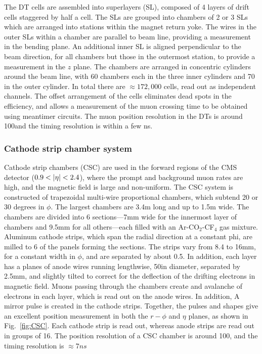 The DT cells are assembled into superlayers (SL), composed of 
4 layers of drift cells staggered by half a cell. 
The SLs are grouped into chambers of 2 or 3 SLs which are arranged into stations
within the magnet return yoke.
The wires in the outer SLs within a chamber are parallel to beam line, providing
a measurement in the bending plane.
An additional inner SL is aligned perpendicular to the beam direction, 
for all chambers but those in the 
outermost station, to provide a measurement in the $z$ plane. 
The chambers are arranged in concentric cylinders
around the beam line, with 60 chambers each in the three inner cylinders
and 70 in the outer cylinder. In total there are $\approx172,000$ 
cells, read out as independent channels. The offset arrangement of the cells
eliminates dead spots in the efficiency, and allows a measurement of the
muon crossing time to be obtained using meantimer circuits.
The muon position resolution in the DTs is around 100\micron and the
timing resolution is within a few ns.

\subsubsection{Cathode strip chamber system}

Cathode strip chambers (CSC) are used in
the forward regions of the CMS detector ($0.9 < \lvert \eta \rvert < 2.4$), 
where the prompt and background muon rates are high, and the magnetic field
is large and non-uniform. The CSC system is constructed of trapezoidal
multi-wire proportional chambers,
which subtend 20 or 30 degrees in $\phi$. The largest chambers are 3.4\unit{m}
long and up to 1.5\unit{m} wide. The chambers are divided into 6 sections---7\unit{mm} 
wide for the innermost layer of chambers and 9.5\unit{mm} for all 
others---each filled with an Ar-CO$_2$-CF$_4$ gas mixture. Aluminum cathode strips,
which span the radial direction at a constant phi, 
are milled to 6 of the panels forming the sections. The strips vary from
8.4 to 16\unit{mm}, for a constant width in $\phi$, and are separated by about 0.5\mm. 
In addition, each layer has a planes of anode wires running lengthwise, 
50\micron in diameter, separated by 2.5\unit{mm}, and slightly tilted to correct
for the deflection of the drifting electrons in magnetic field.
Muons passing through the chambers create and avalanche
of electrons in each layer, which is read out on the anode wires. In addition,
A mirror pulse is created in the cathode strips.
Together, the pulses and shapes give an excellent position measurement 
in both the $r-\phi$ and $\eta$ planes, as shown in Fig.~\ref{fig:CSC}.
Each cathode strip is read out, whereas anode strips are read out in
groups of 16. The position resolution of a CSC chamber is around
100\micron, and the timing resolution is $\approx7\unit{ns}$

